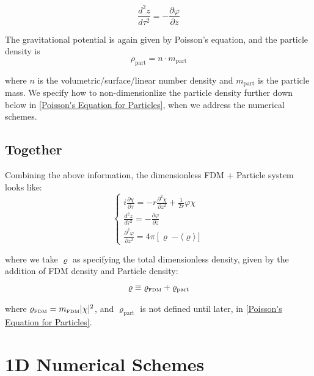 \documentclass[oneside]{book}
\newcommand{\pd}{\partial}
\begin{document}
\begin{equation}
    \frac{d^2 z}{d\tau^2} = -\frac{\pd \varphi}{\pd z}
\end{equation}

The gravitational potential is again given by Poisson's equation, and the particle density is 
\begin{equation}
\rho_\text{part} = n \cdot m_{\text{part}}
\label{Particle density}
\end{equation}

where $n$ is the volumetric/surface/linear number density and $m_{\text{part}}$ is the particle mass. We specify how to non-dimensionlize the particle density further down below in \cref{Poisson's Equation for Particles}, when we address the numerical schemes.
    
\section{Together}\label{Together}
Combining the above information, the dimensionless FDM + Particle system looks like:
\begin{equation}
    \begin{cases}
    i\frac{\pd \chi}{\pd \tau} = -r\frac{\pd^2 \chi}{\pd z^2} + \frac{1}{2r}\varphi\chi \\
    
    \frac{d^2 z}{d\tau^2} = -\frac{\pd \varphi}{\pd z}\\
    
    \frac{\pd^2 \varphi}{\pd z^2} = 4\pi \left[{\varrho} - \langle{\varrho}\rangle\right]
    \end{cases}
    \label{FULL-NonDim}
\end{equation}

where we take ${\varrho}$ as specifying the total dimensionless density, given by the addition of FDM density and Particle density:
\begin{equation}
    \varrho \equiv \varrho_\text{\tiny{FDM}} + \varrho_\text{part} 
\end{equation}

where $\varrho_\text{\tiny{FDM}} = m_\text{\tiny{FDM}}|\chi|^2$, and $\varrho_\text{part}$ is not defined until later, in \cref{Poisson's Equation for Particles}.
\chapter{1D Numerical Schemes}
\end{document}
